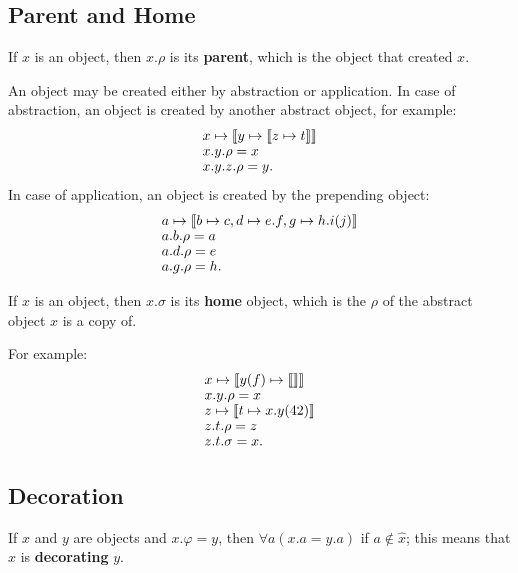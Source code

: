 \subsection{Parent and Home}

\begin{definition}\label{def:parent}
If \(x\) is an object, then \(x.\rho\) is its \textbf{parent},
which is the object that created \(x\).
\end{definition}

An object may be created either by
abstraction or application. In case of abstraction, an object
is created by another abstract object, for example:
  \begin{equation}
  \begin{split}
  & x \mapsto \llbracket y \mapsto \llbracket z \mapsto t \rrbracket \rrbracket \br
  & x.y.\rho = x \br
  & x.y.z.\rho = y.
  \end{split}
  \end{equation}
In case of application, an object is created by the prepending object:
  \begin{equation}
  \begin{split}
  & a \mapsto \llbracket b \mapsto c, d \mapsto e.f, g \mapsto h.i(j) \rrbracket \br
  & a.b.\rho = a \br
  & a.d.\rho = e \br
  & a.g.\rho = h.
  \end{split}
  \end{equation}

\begin{definition}\label{def:home}
If \(x\) is an object, then \(x.\sigma\) is its \textbf{home} object, which
is the \(\rho\) of the abstract object \(x\) is a copy of.
\end{definition}

For example:
\begin{equation}
\begin{split}
& x \mapsto \llbracket y(f) \mapsto \llbracket \rrbracket \rrbracket \br
& x.y.\rho = x \br
& z \mapsto \llbracket t \mapsto x.y(42) \rrbracket \br
& z.t.\rho = z \br
& z.t.\sigma = x.
\end{split}
\end{equation}

\subsection{Decoration}\label{sec:decoration}

\begin{definition}\label{def:decorator}
If \(x\) and \(y\) are objects and \(x.\varphi = y\), then
  \(\forall a (x.a = y.a)\) if \(a \not\in \hat{x}\);
  this means that \(x\) is \textbf{decorating} \(y\).
\end{definition}

